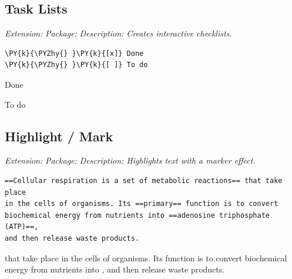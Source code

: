 \documentclass[a4paper,twoside]{article}
\begin{document}
\subsection{Task Lists}
\emph{Extension: }
\emph{Package: }
\emph{Description: Creates interactive checklists.}
\begin{tscode}[lang=md, engine=pygments]
\begin{Verbatim}[commandchars=\\\{\},breaklines, breakanywhere, commandchars=\\\{\}]
\PY{k}{\PYZhy{} }\PY{k}{[x]} Done
\PY{k}{\PYZhy{} }\PY{k}{[ ]} To do
\end{Verbatim}
\end{tscode}
\begin{displayquote}
\begin{tstasklist}
\item[\tsdone] Done
\item[\tstodo] To do
\end{tstasklist}
\end{displayquote}
\subsection{Highlight / Mark}
\emph{Extension: }
\emph{Package: }
\emph{Description: Highlights text with a marker effect.}
\begin{tscode}[lang=md, engine=pygments]
\begin{Verbatim}[commandchars=\\\{\},breaklines, breakanywhere, commandchars=\\\{\}]
==Cellular respiration is a set of metabolic reactions== that take place
in the cells of organisms. Its ==primary== function is to convert
biochemical energy from nutrients into ==adenosine triphosphate (ATP)==,
and then release waste products.
\end{Verbatim}
\end{tscode}
\begin{displayquote}
 that take place in the
cells of organisms. Its  function is to convert biochemical energy
from nutrients into , and then release waste
products.
\end{displayquote}
\end{document}
